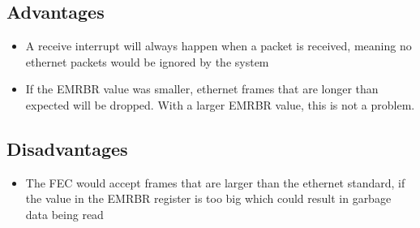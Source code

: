 \section{}
\subsection*{Advantages}
\begin{itemize}
  \item A receive interrupt will always happen when a packet is received,
    meaning no ethernet packets would be ignored by the system
  \item If the EMRBR value was smaller, ethernet frames that are longer than
    expected will be dropped. With a larger EMRBR value, this is not a problem.
\end{itemize}

\subsection*{Disadvantages}
\begin{itemize}
  \item The FEC would accept frames that are larger than the ethernet standard,
    if the value in the EMRBR register is too big which could result in garbage
    data being read
\end{itemize}
